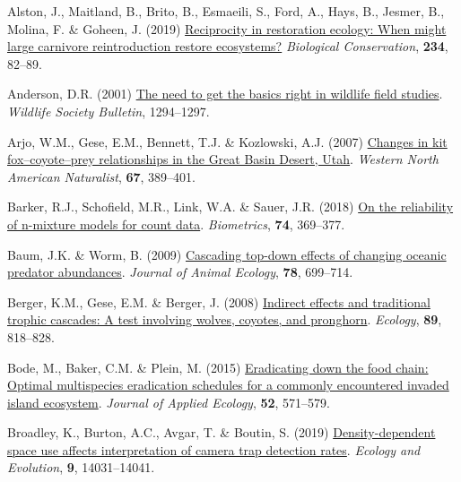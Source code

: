 \documentclass[preprint, 3p, authoryear]{elsarticle} %
\newlength{\cslhangindent}
\newlength{\cslentryspacingunit} %
\newenvironment{CSLReferences}[2] %
 {%
  \setlength{\parindent}{0pt}
  \ifodd #1
  \let\oldpar\par
  \def\par{\hangindent=\cslhangindent\oldpar}
  \fi
  \setlength{\parskip}{#2\cslentryspacingunit}
 }%
 {}
\begin{document}
\hypertarget{refs}{}
\begin{CSLReferences}{1}{0}
\leavevmode{}%
Alston, J., Maitland, B., Brito, B., Esmaeili, S., Ford, A., Hays, B., Jesmer, B., Molina, F. \& Goheen, J. (2019) \href{https://doi.org/10.1016/j.biocon.2019.03.021}{Reciprocity in restoration ecology: When might large carnivore reintroduction restore ecosystems?} \emph{Biological Conservation}, \textbf{234}, 82--89.

\leavevmode{}%
Anderson, D.R. (2001) \href{https://doi.org/10.2307/3784156}{The need to get the basics right in wildlife field studies}. \emph{Wildlife Society Bulletin}, 1294--1297.

\leavevmode{}%
Arjo, W.M., Gese, E.M., Bennett, T.J. \& Kozlowski, A.J. (2007) \href{https://doi.org/10.3398/1527-0904(2007)67\%5B389:CIKFRI\%5D2.0.CO;2}{{Changes in kit fox--coyote--prey relationships in the Great Basin Desert, Utah}}. \emph{Western North American Naturalist}, \textbf{67}, 389--401.

\leavevmode{}%
Barker, R.J., Schofield, M.R., Link, W.A. \& Sauer, J.R. (2018) \href{https://doi.org/10.1111/biom.12734}{On the reliability of n-mixture models for count data}. \emph{Biometrics}, \textbf{74}, 369--377.

\leavevmode{}%
Baum, J.K. \& Worm, B. (2009) \href{https://doi.org/10.1111/j.1365-2656.2009.01531.x}{Cascading top-down effects of changing oceanic predator abundances}. \emph{Journal of Animal Ecology}, \textbf{78}, 699--714.

\leavevmode{}%
Berger, K.M., Gese, E.M. \& Berger, J. (2008) \href{https://doi.org/10.1890/07-0193.1}{Indirect effects and traditional trophic cascades: A test involving wolves, coyotes, and pronghorn}. \emph{Ecology}, \textbf{89}, 818--828.

\leavevmode{}%
Bode, M., Baker, C.M. \& Plein, M. (2015) \href{https://doi.org/10.1111/1365-2664.12429}{Eradicating down the food chain: Optimal multispecies eradication schedules for a commonly encountered invaded island ecosystem}. \emph{Journal of Applied Ecology}, \textbf{52}, 571--579.

\leavevmode{}%
Broadley, K., Burton, A.C., Avgar, T. \& Boutin, S. (2019) \href{https://doi.org/10.1002/ece3.5840}{Density-dependent space use affects interpretation of camera trap detection rates}. \emph{Ecology and Evolution}, \textbf{9}, 14031--14041.


\end{CSLReferences}
\end{document}
